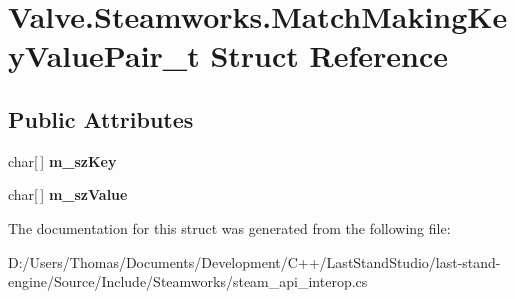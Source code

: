 \hypertarget{structValve_1_1Steamworks_1_1MatchMakingKeyValuePair__t}{}\section{Valve.\+Steamworks.\+Match\+Making\+Key\+Value\+Pair\+\_\+t Struct Reference}
\label{structValve_1_1Steamworks_1_1MatchMakingKeyValuePair__t}
\subsection*{Public Attributes}
\begin{DoxyCompactItemize}
\item 
\hypertarget{structValve_1_1Steamworks_1_1MatchMakingKeyValuePair__t_a394fdf289d9a5fc26040cf80abd6c5f6}{}char\mbox{[}$\,$\mbox{]} {\bfseries m\+\_\+sz\+Key}\label{structValve_1_1Steamworks_1_1MatchMakingKeyValuePair__t_a394fdf289d9a5fc26040cf80abd6c5f6}

\item 
\hypertarget{structValve_1_1Steamworks_1_1MatchMakingKeyValuePair__t_aa9763a60e948f530aa582b2d6c1d7fd7}{}char\mbox{[}$\,$\mbox{]} {\bfseries m\+\_\+sz\+Value}\label{structValve_1_1Steamworks_1_1MatchMakingKeyValuePair__t_aa9763a60e948f530aa582b2d6c1d7fd7}

\end{DoxyCompactItemize}


The documentation for this struct was generated from the following file\+:\begin{DoxyCompactItemize}
\item 
D\+:/\+Users/\+Thomas/\+Documents/\+Development/\+C++/\+Last\+Stand\+Studio/last-\/stand-\/engine/\+Source/\+Include/\+Steamworks/steam\+\_\+api\+\_\+interop.\+cs\end{DoxyCompactItemize}
